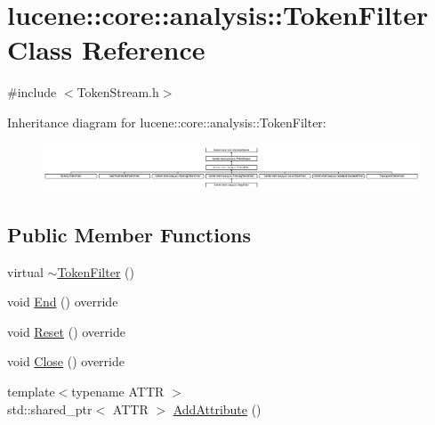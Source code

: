 \hypertarget{classlucene_1_1core_1_1analysis_1_1TokenFilter}{}\section{lucene\+:\+:core\+:\+:analysis\+:\+:Token\+Filter Class Reference}
\label{classlucene_1_1core_1_1analysis_1_1TokenFilter}


{\ttfamily \#include $<$Token\+Stream.\+h$>$}

Inheritance diagram for lucene\+:\+:core\+:\+:analysis\+:\+:Token\+Filter\+:\begin{figure}[H]
\begin{center}
\leavevmode
\includegraphics[height=1.413428cm]{classlucene_1_1core_1_1analysis_1_1TokenFilter}
\end{center}
\end{figure}
\subsection*{Public Member Functions}
\begin{DoxyCompactItemize}
\item 
virtual \mbox{\hyperlink{classlucene_1_1core_1_1analysis_1_1TokenFilter_a45308aa10bddc55d4632998ed593be24}{$\sim$\+Token\+Filter}} ()
\item 
void \mbox{\hyperlink{classlucene_1_1core_1_1analysis_1_1TokenFilter_ad2e29dd32aa4df385d0f290f10f20721}{End}} () override
\item 
void \mbox{\hyperlink{classlucene_1_1core_1_1analysis_1_1TokenFilter_a0671ee825db7735a7b72b7a27a457ed9}{Reset}} () override
\item 
void \mbox{\hyperlink{classlucene_1_1core_1_1analysis_1_1TokenFilter_a4b991b01385423b87b5714061e4326c8}{Close}} () override
\item 
{\footnotesize template$<$typename A\+T\+TR $>$ }\\std\+::shared\+\_\+ptr$<$ A\+T\+TR $>$ \mbox{\hyperlink{classlucene_1_1core_1_1analysis_1_1TokenFilter_aea9fad2c3d7b0ae4448653ab5cb3272c}{Add\+Attribute}} ()
\end{DoxyCompactItemize}
